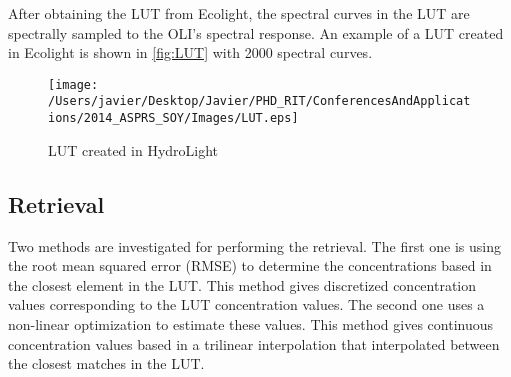 After obtaining the LUT from Ecolight, the spectral curves in the LUT are spectrally sampled to the OLI's spectral response. An example of a LUT created in Ecolight is shown in \autoref{fig:LUT} with 2000 spectral curves. 

\begin{figure}[htb]
    \centering
      \texttt{[image: /Users/javier/Desktop/Javier/PHD\_RIT/ConferencesAndApplications/2014\_ASPRS\_SOY/Images/LUT.eps]}
      \caption{LUT created in HydroLight}
      \label{fig:LUT}
\end{figure}




\subsection{Retrieval}
Two methods are investigated for performing the retrieval. The first one is using the root mean squared error (RMSE) to determine the concentrations based in the closest element in the LUT. This method gives discretized concentration values corresponding to the LUT concentration values. The second one uses a non-linear optimization to estimate these values. This method gives continuous concentration values based in a trilinear interpolation that interpolated between the closest matches in the LUT.
